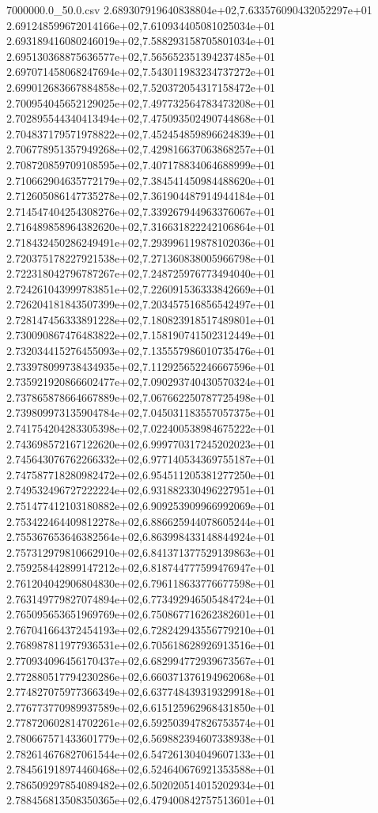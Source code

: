 \begin{filecontents*}{7000000.0_50.0.csv}
2.689307919640838804e+02,7.633576090432052297e+01
2.691248599672014166e+02,7.610934405081025034e+01
2.693189416080246019e+02,7.588293158705801034e+01
2.695130368875636577e+02,7.565652351394237485e+01
2.697071458068247694e+02,7.543011983234737272e+01
2.699012683667884858e+02,7.520372054317158472e+01
2.700954045652129025e+02,7.497732564783473208e+01
2.702895544340413494e+02,7.475093502490744868e+01
2.704837179571978822e+02,7.452454859896624839e+01
2.706778951357949268e+02,7.429816637063868257e+01
2.708720859709108595e+02,7.407178834064688999e+01
2.710662904635772179e+02,7.384541450984488620e+01
2.712605086147735278e+02,7.361904487914944184e+01
2.714547404254308276e+02,7.339267944963376067e+01
2.716489858964382620e+02,7.316631822242106864e+01
2.718432450286249491e+02,7.293996119878102036e+01
2.720375178227921538e+02,7.271360838005966798e+01
2.722318042796787267e+02,7.248725976773494040e+01
2.724261043999783851e+02,7.226091536333842669e+01
2.726204181843507399e+02,7.203457516856542497e+01
2.728147456333891228e+02,7.180823918517489801e+01
2.730090867476483822e+02,7.158190741502312449e+01
2.732034415276455093e+02,7.135557986010735476e+01
2.733978099738434935e+02,7.112925652246667596e+01
2.735921920866602477e+02,7.090293740430570324e+01
2.737865878664667889e+02,7.067662250787725498e+01
2.739809973135904784e+02,7.045031183557057375e+01
2.741754204283305398e+02,7.022400538984675222e+01
2.743698572167122620e+02,6.999770317245202023e+01
2.745643076762266332e+02,6.977140534369755187e+01
2.747587718280982472e+02,6.954511205381277250e+01
2.749532496727222224e+02,6.931882330496227951e+01
2.751477412103180882e+02,6.909253909966992069e+01
2.753422464409812278e+02,6.886625944078605244e+01
2.755367653646382564e+02,6.863998433148844924e+01
2.757312979810662910e+02,6.841371377529139863e+01
2.759258442899147212e+02,6.818744777599476947e+01
2.761204042906804830e+02,6.796118633776677598e+01
2.763149779827074894e+02,6.773492946505484724e+01
2.765095653651969769e+02,6.750867716262382601e+01
2.767041664372454193e+02,6.728242943556779210e+01
2.768987811977936531e+02,6.705618628926913516e+01
2.770934096456170437e+02,6.682994772939673567e+01
2.772880517794230286e+02,6.660371376194962068e+01
2.774827075977366349e+02,6.637748439319329918e+01
2.776773770989937589e+02,6.615125962968431850e+01
2.778720602814702261e+02,6.592503947826753574e+01
2.780667571433601779e+02,6.569882394607338938e+01
2.782614676827061544e+02,6.547261304049607133e+01
2.784561918974460468e+02,6.524640676921353588e+01
2.786509297854089482e+02,6.502020514015202934e+01
2.788456813508350365e+02,6.479400842757513601e+01

\end{filecontents*}
